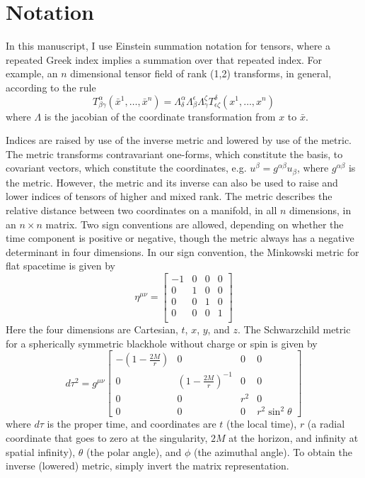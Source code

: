 \section{Notation}
In this manuscript, I use Einstein summation notation for tensors, where a repeated Greek index implies a summation over that repeated index. For example, an $n$ dimensional tensor field of rank (1,2) transforms, in general, according to the rule
\begin{equation}
  T^\alpha_{\beta\gamma}(\bar{x}^1,\ldots,\bar{x}^n)=\Lambda^\alpha_\delta\Lambda^\epsilon_\beta\Lambda^\zeta_\gamma T^\delta_{\epsilon\zeta}(x^1,\ldots,x^n)
\end{equation}
where $\Lambda$ is the jacobian of the coordinate transformation from $x$ to $\bar{x}$. 

Indices are raised by use of the inverse metric and lowered by use of the metric. The metric transforms contravariant one-forms, which constitute the basis, to covariant vectors, which constitute the coordinates, e.g. $u^\beta=g^{\alpha\beta}u_\beta$, where $g^{\alpha\beta}$ is the metric. However, the metric and its inverse can also be used to raise and lower indices of tensors of higher and mixed rank. The metric describes the relative distance between two coordinates on a manifold, in all $n$ dimensions, in an $n\times n$ matrix. Two sign conventions are allowed, depending on whether the time component is positive or negative, though the metric always has a negative determinant in four dimensions. In our sign convention, the Minkowski metric for flat spacetime is given by
\[
\eta^{\mu\nu}=
\begin{bmatrix}
  -1 & 0 & 0 & 0\\
  0 & 1 & 0 & 0\\
  0 & 0 & 1 & 0\\
  0 & 0 & 0 & 1\\
\end{bmatrix}
\]
Here the four dimensions are Cartesian, $t$, $x$, $y$, and $z$. The Schwarzchild metric for a spherically symmetric blackhole without charge or spin is given by
\[
d\tau^2=g^{\mu\nu}
\begin{bmatrix}
  -(1-\frac{2M}{r}) & 0 & 0 & 0\\
  0 & (1-\frac{2M}{r})^{-1} & 0 &0\\
  0 & 0 & r^2 & 0\\
  0 & 0 & 0 & r^2\sin^2\theta
\end{bmatrix}
\]
where $d\tau$ is the proper time, and coordinates are $t$ (the local time), $r$ (a radial coordinate that goes to zero at the singularity, $2M$ at the horizon, and infinity at spatial infinity), $\theta$ (the polar angle), and $\phi$ (the azimuthal angle). To obtain the inverse (lowered) metric, simply invert the matrix representation.
